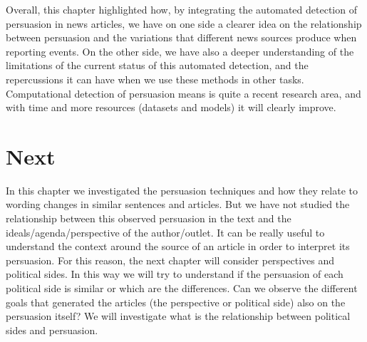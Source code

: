 Overall, this chapter highlighted how, by integrating the automated detection of persuasion in news articles, we have on one side a clearer idea on the relationship between persuasion and the variations that different news sources produce when reporting events.
On the other side, we have also a deeper understanding of the limitations of the current status of this automated detection, and the repercussions it can have when we use these methods in other tasks.
Computational detection of persuasion means is quite a recent research area, and with time and more resources (datasets and models) it will clearly improve.

\section{\statusgreen Next}
In this chapter we investigated the persuasion techniques and how they relate to wording changes in similar sentences and articles.
But we have not studied the relationship between this observed persuasion in the text and the ideals/agenda/perspective of the author/outlet.
It can be really useful to understand the context around the source of an article in order to interpret its persuasion.
For this reason, the next chapter will consider perspectives and political sides.
In this way we will try to understand if the persuasion of each political side is similar or which are the differences.
Can we observe the different goals that generated the articles (the perspective or political side) also on the persuasion itself? We will investigate what is the relationship between political sides and persuasion.
